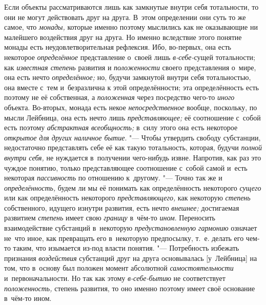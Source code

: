 Если объекты рассматриваются лишь как замкнутые внутри себя
тотальности, то они не могут действовать друг на друга. В~этом определении
они суть то же самое, что {\em монады,}
которые именно поэтому мыслились как не оказывающие ни
малейшего воздействия друг на друга. Но именно вследствие этого понятие
монады есть неудовлетворительная рефлексия. Ибо, во-первых, она есть
некоторое {\em определённое} представление о~своей лишь {\em в-себе-}сущей
тотальности; как {\em известная степень} развития и {\em положенности} своего
представления о~мире, она есть нечто {\em определённое;} но,
будучи замкнутой внутри себя тотальностью, она вместе с~тем и~безразлична к
этой определённости; эта определённость есть поэтому не её собственная, а
{\em положенная} через посредство чего-то {\em иного}
объекта. Во-вторых, монада есть некое {\em непосредственное}
вообще, поскольку, по мысли Лейбница, она есть нечто лишь
{\em представляющее;} её соотношение с~собой есть поэтому
{\em абстрактная всеобщность;} в~силу этого она есть некоторое
{\em открытое} {\em для других наличное бытие}. "---
Чтобы утвердить свободу субстанции, недостаточно представлять
себе её как такую тотальность, которая, будучи {\em полной внутри себя,}
не нуждается в~получении чего-нибудь извне. Напротив, как раз
это чуждое понятию, только представляющее соотношение с~собой самой и~есть
некоторая {\em пассивность} по отношению к~другому. "--- Точно так же и
{\em определённость,} будем ли мы её понимать как определённость некоторого
{\em сущего} или как определённость некоторого {\em представляющего,}
как некоторую {\em степень} собственного, идущего изнутри развития, есть нечто
{\em внешнее;} достигаемая развитием {\em степень} имеет свою
{\em границу} в~чём-то {\em ином}. Переносить
взаимодействие субстанций в~некоторую
{\em предустановленную гармонию}
означает не~что иное, как превращать его в~некоторую
предпосылку, т.~е. делать его чем-то таким, что изымается из-под власти
понятия. "--- Потребность избежать признания {\em воздействия}
субстанций друг на друга основывалась [у~Лейбница] на том,
что в~основу был положен момент абсолютной
{\em самостоятельности} и~первоначальности. Но так как этому
{\em в-себе-бытию} не соответствует {\em положенность,}
степень развития, то оно именно поэтому имеет своё основание в~чём-то ином.

